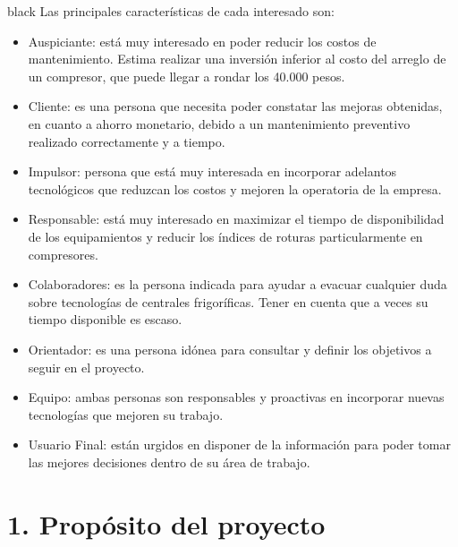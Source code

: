 \documentclass[
11pt, %
]{charter}
\begin{document}
\begin{consigna}{black}
Las principales características de cada interesado son:
\begin{itemize}
	\item Auspiciante: está muy interesado en poder reducir los costos de mantenimiento. Estima realizar una inversión inferior al costo del arreglo de un compresor, que puede llegar a rondar los 40.000 pesos.
	\item Cliente: es una persona que necesita poder constatar las mejoras obtenidas, en cuanto a ahorro monetario, debido a un mantenimiento preventivo realizado correctamente y a tiempo.
	\item Impulsor: persona que está muy interesada en incorporar adelantos tecnológicos que reduzcan los costos y mejoren la operatoria de la empresa.
	\item Responsable: está muy interesado en maximizar el tiempo de disponibilidad de los equipamientos y reducir los índices de roturas particularmente en compresores.
	\item Colaboradores: es la persona indicada para ayudar a evacuar cualquier duda sobre tecnologías de centrales frigoríficas. Tener en cuenta que a veces su tiempo disponible es escaso.
	\item Orientador: es una persona idónea para consultar y definir los objetivos a seguir en el proyecto.
	\item Equipo: ambas personas son responsables y proactivas en incorporar nuevas tecnologías que mejoren su trabajo.
	\item Usuario Final: están urgidos en disponer de la información para poder tomar las mejores decisiones dentro de su área de trabajo.
\end{itemize}
\end{consigna}



\section{1. Propósito del proyecto}
\label{sec:proposito}
\end{document}
